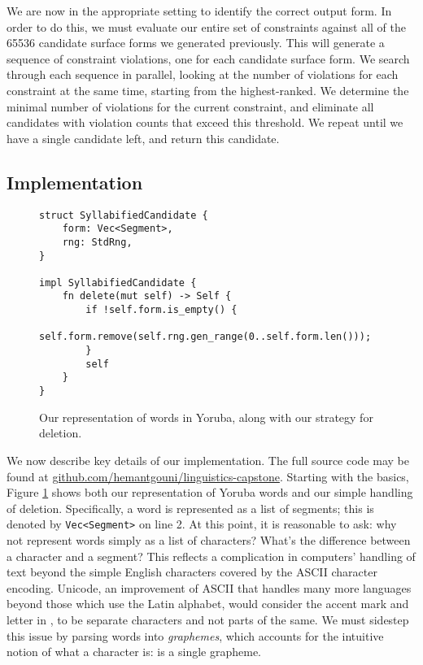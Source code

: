 \documentclass[12pt]{article}
\begin{document}
We are now in the appropriate setting to identify the correct output form. In
order to do this, we must evaluate our entire set of constraints against all of
the 65536 candidate surface forms we generated previously. This will generate a
sequence of constraint violations, one for each candidate surface form. We
search through each sequence in parallel, looking at the number of violations
for each constraint at the same time, starting from the highest-ranked. We
determine the minimal number of violations for the current constraint, and
eliminate all candidates with violation counts that exceed this threshold. We
repeat until we have a single candidate left, and return this candidate.

\subsection{Implementation}

\begin{figure}[h]
\caption{Our representation of words in Yoruba, along with our strategy for deletion.}
\label{fig:impl-deletion}
\begin{verbatim}
struct SyllabifiedCandidate {
    form: Vec<Segment>,
    rng: StdRng,
}

impl SyllabifiedCandidate {
    fn delete(mut self) -> Self {
        if !self.form.is_empty() {
            self.form.remove(self.rng.gen_range(0..self.form.len()));
        }
        self
    }
}
\end{verbatim}
\end{figure}

We now describe key details of our implementation. The full source code may be
found at \href{https://github.com/hemantgouni/linguistics-capstone}{github.com/hemantgouni/linguistics-capstone}.
Starting with the basics, Figure \ref{fig:impl-deletion} shows both our
representation of Yoruba words and our simple handling of deletion.
Specifically, a word is represented as a list of segments; this is denoted by
\texttt{Vec<Segment>} on line 2.
At this point, it is reasonable to ask: why not represent words simply
as a list of characters? What's the difference between a character and a segment?
This reflects a complication in computers' handling of text beyond the
simple English characters covered by the ASCII character encoding. Unicode, an
improvement of ASCII that handles many more languages beyond those which use the
Latin alphabet, would consider the accent mark and letter  in ,
to be separate characters and not parts of the same. We must sidestep this issue by
parsing words into \textit{graphemes}, which accounts for the intuitive notion
of what a character is:  is a single grapheme.
\end{document}
